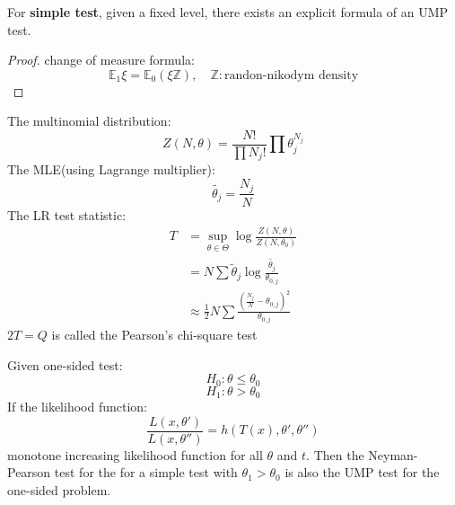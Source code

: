 \begin{theorem}
For \textbf{simple test}, given a fixed level, there exists an explicit formula of an UMP test.
\end{theorem}
\begin{proof}
	change of measure formula:
	\begin{equation*}
		\mathbb{E}_1 \xi = \mathbb{E}_0 (\xi \mathbb{Z}), \quad \mathbb{Z}: \text{randon-nikodym density}
	\end{equation*}
\end{proof}


\begin{method}
The multinomial distribution:
\begin{equation}
	Z(N, \theta) = \frac{N!}{\prod N_j !} \prod \theta_j^{N_j}
\end{equation}
The MLE(using Lagrange multiplier):
\begin{equation*}
	\tilde{\theta_j} = \frac{N_j}{N}
\end{equation*}
The LR test statistic:
\begin{align*}
	T &= \sup_{\theta \in \Theta} \log \frac{Z(N, \theta)}{Z(N, \theta_0)}\\
	&= N \sum \tilde{\theta}_j \log \frac{\tilde{\theta_j}}{\theta_{0, j}}\\
	&\approx \frac{1}{2} N \sum \frac{(\frac{N_j}{N} - \theta_{0, j})^2}{\theta_{0, j}}
\end{align*}
$2T = Q$ is called the Pearson's chi-square test
\end{method}





\begin{theorem}
Given one-sided test:
\begin{equation*}
    H_{0}: \theta \leq \theta_{0}
\end{equation*}
\begin{equation*}
        H_{1}: \theta > \theta_{0}
\end{equation*}
If the likelihood function:
\begin{equation*}
    \frac{L(x, \theta')}{L(x, \theta'')} = h(T(x), \theta', \theta'')
\end{equation*}
monotone increasing likelihood function for all $\theta$ and $t$. Then the Neyman-Pearson test for the for a simple test with $\theta_1 > \theta_0$ is also the UMP test for the one-sided problem.
\end{theorem}




